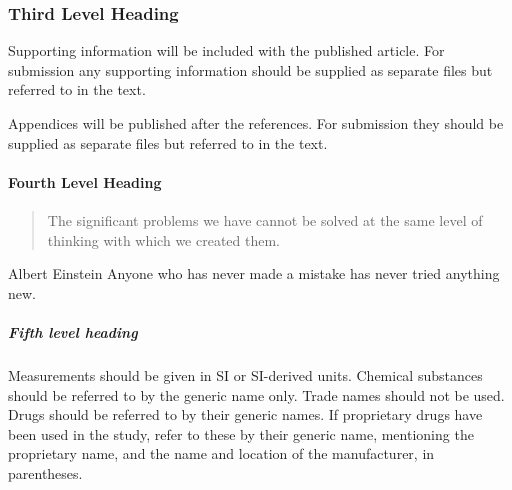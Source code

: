 \documentclass[alpha-refs,serif]{ecotropicos-article}
\begin{document}
\begin{multicols}{2}
\subsubsection*{Third Level Heading}
Supporting information will be included with the published article. For submission any supporting information should be supplied as separate files but referred to in the text.

Appendices will be published after the references. For submission they should be supplied as separate files but referred to in the text.

\paragraph{Fourth Level Heading}
\begin{quote}
The significant problems we have cannot be solved at the same level of thinking with which we created them.
\end{quote}

\begin{epigraph}{Albert Einstein}
Anyone who has never made a mistake has never tried anything new.
\end{epigraph}

\subparagraph{Fifth level heading}
Measurements should be given in SI or SI-derived units.
Chemical substances should be referred to by the generic name only. Trade names should not be used. Drugs should be referred to by their generic names. If proprietary drugs have been used in the study, refer to these by their generic name, mentioning the proprietary name, and the name and location of the manufacturer, in parentheses.
\end{multicols}
\end{document}
